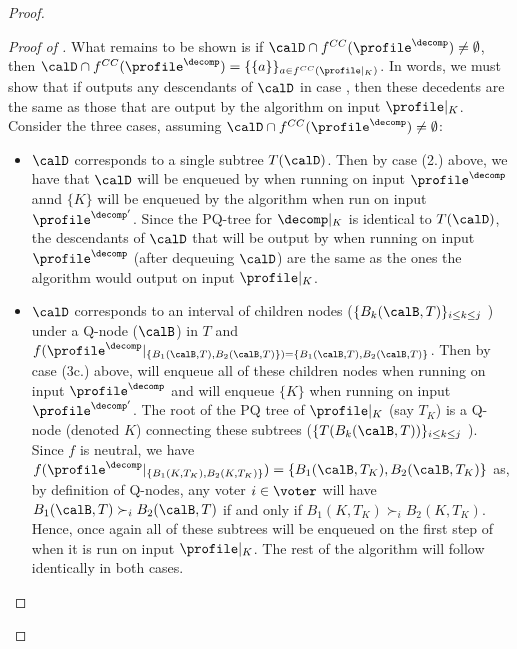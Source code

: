 \begin{proof}
\begin{proof}[Proof of ]
    What remains to be shown is if $ \calD \cap f^{CC}(\profile^\decomp) \neq \emptyset$, then $\calD \cap f^{CC}(\profile^\decomp)=\{\{a\}\}_{a \in f^{CC}(\profile|_{K})}$. In words, we must show that  if  outputs any descendants of $\calD$ in case \casea, then these decedents are the same as those that are output by the algorithm on input $\profile|_K$. Consider the three cases, assuming $ \calD \cap f^{CC}(\profile^\decomp) \neq \emptyset$: 
        \begin{itemize}
            \item $\calD$ corresponds to a single subtree $T(\calD)$. Then by case (2.) above, we have that $\calD$ will be enqueued by  when running on input $\profile^\decomp$ annd $\{K\}$ will be enqueued by the algorithm when run on input $\profile^{\decomp'}$. Since the PQ-tree for $\decomp|_K$ is identical to $T(\calD)$, the descendants of $\calD$ that will be output by  when running on input $\profile^\decomp$ (after dequeuing $\calD$) are the same as the ones the algorithm would output on input $\profile|_K$.
            \item $\calD$ corresponds to an interval of children nodes ($\{B_k(\calB,T)\}_{i \leq k \leq j}$ ) under a Q-node ($\calB$) in $T$ and $f(\profile^{\decomp}|_{{\{B_1(\calB,T),B_2(\calB,T)\}})=\{B_1(\calB,T),B_2(\calB,T)\}}$. Then by case (3c.) above,  will enqueue all of these children nodes when running on input $\profile^\decomp$ and will enqueue $\{K\}$ when running on input $\profile^{\decomp'}$. The root of the PQ tree of $\profile|_K$ (say $T_K$) is a Q-node (denoted $K$) connecting these subtrees ($\{T(B_k(\calB,T))\}_{i \leq k \leq j}$ ). Since $f$ is neutral, we have $f(\profile^{\decomp}|_{\{B_1(K,T_K),B_2(K,T_K)\}})=\{B_1(\calB,T_K),B_2(\calB,T_K)\}$ as, by definition of Q-nodes, any voter $i \in \voter$ will have $B_1(\calB,T) \succ_{i} B_2(\calB,T)$ if and only if $B_1(K,T_K) \succ_{i} B_2(K,T_K)$. Hence, once again all of these subtrees will be enqueued on the first step of  when it is run on input $\profile|_K$. The rest of the algorithm will follow identically in both cases.

\end{itemize}
\end{proof}
\end{proof}
